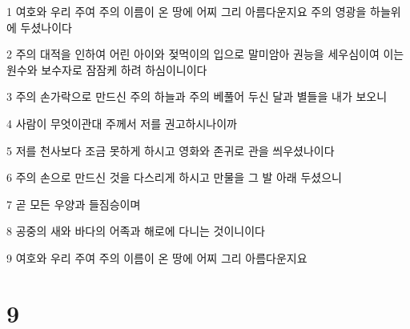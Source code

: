 \par 1 여호와 우리 주여 주의 이름이 온 땅에 어찌 그리 아름다운지요 주의 영광을 하늘위에 두셨나이다
\par 2 주의 대적을 인하여 어린 아이와 젖먹이의 입으로 말미암아 권능을 세우심이여 이는 원수와 보수자로 잠잠케 하려 하심이니이다
\par 3 주의 손가락으로 만드신 주의 하늘과 주의 베풀어 두신 달과 별들을 내가 보오니
\par 4 사람이 무엇이관대 주께서 저를 권고하시나이까
\par 5 저를 천사보다 조금 못하게 하시고 영화와 존귀로 관을 씌우셨나이다
\par 6 주의 손으로 만드신 것을 다스리게 하시고 만물을 그 발 아래 두셨으니
\par 7 곧 모든 우양과 들짐승이며
\par 8 공중의 새와 바다의 어족과 해로에 다니는 것이니이다
\par 9 여호와 우리 주여 주의 이름이 온 땅에 어찌 그리 아름다운지요

\chapter{9}

